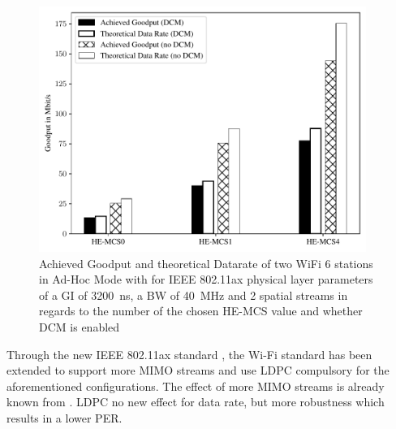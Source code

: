 \begin{figure}%
	\centering
	\includegraphics[width=0.95\textwidth]{figures/DCM_dataRate_simulation.pdf}
	\caption{Achieved Goodput and theoretical Datarate of two WiFi 6 stations in Ad-Hoc Mode with for IEEE 802.11ax physical layer parameters of a \ac{GI} of \SI{3200}{\nano\second}, a \ac{BW} of \SI{40}{\mega\hertz} and 2 spatial streams  in regards to the number of the chosen HE-\ac{MCS} value and whether \ac{DCM} is enabled}%
	\label{fig:Data_rate_DCM}%
\end{figure}

Through the new IEEE 802.11ax standard \cite{noauthor_ieee_2021}, the Wi-Fi standard has been extended to support more \ac{MIMO} streams and use \ac{LDPC} compulsory for the
aforementioned configurations. The effect of more \ac{MIMO} streams is already known from \cite{Lot of stuff}.
\ac{LDPC} no new effect for data rate, but more robustness which results in a lower \ac{PER}.